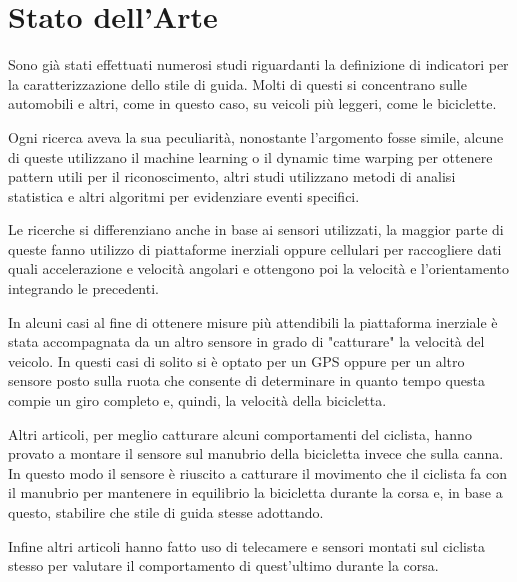 \documentclass[class=article]{standalone}
\begin{document}
	\section{Stato dell'Arte}
	Sono già stati effettuati numerosi studi riguardanti la definizione di indicatori per la caratterizzazione dello stile di guida.
	Molti di questi si concentrano sulle automobili e altri, come in questo caso, su veicoli più leggeri, come le biciclette.
	
	Ogni ricerca aveva la sua peculiarità, nonostante l'argomento fosse simile, alcune di queste utilizzano il machine learning o il dynamic time warping per ottenere pattern utili per il riconoscimento, altri studi utilizzano metodi di analisi statistica e altri algoritmi per evidenziare eventi specifici.
	
	Le ricerche si differenziano anche in base ai sensori utilizzati, la maggior parte di queste fanno utilizzo di piattaforme inerziali oppure cellulari per raccogliere dati quali accelerazione e velocità angolari e ottengono poi la velocità e l'orientamento integrando le precedenti.
	
	In alcuni casi al fine di ottenere misure più attendibili la piattaforma inerziale è stata accompagnata da un altro sensore in grado di "catturare" la velocità del veicolo. In questi casi di solito si è optato per un GPS oppure per un altro sensore posto sulla ruota che consente di determinare in quanto tempo questa compie un giro completo e, quindi, la velocità della bicicletta.
	
	Altri articoli, per meglio catturare alcuni comportamenti del ciclista, hanno provato a montare il sensore sul manubrio della bicicletta invece che sulla canna. In questo modo il sensore è riuscito a catturare il movimento che il ciclista fa con il manubrio per mantenere in equilibrio la bicicletta durante la corsa e, in base a questo, stabilire che stile di guida stesse adottando.
	
	Infine altri articoli hanno fatto uso di telecamere e sensori montati sul ciclista stesso per valutare il comportamento di quest'ultimo durante la corsa.\hfill\break
	
	
%	
	
	
	
	
	
\end{document}
